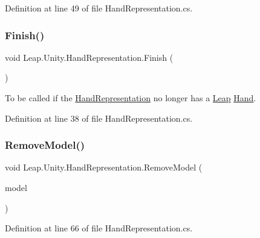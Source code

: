 Definition at line 49 of file Hand\+Representation.\+cs.

\mbox{\label{class_leap_1_1_unity_1_1_hand_representation_a0f6b705675cb8f356b48330637483e78}} 
\subsubsection{\texorpdfstring{Finish()}{Finish()}}
{\footnotesize\ttfamily void Leap.\+Unity.\+Hand\+Representation.\+Finish (\begin{DoxyParamCaption}{ }\end{DoxyParamCaption})}

To be called if the \mbox{\hyperlink{class_leap_1_1_unity_1_1_hand_representation}{Hand\+Representation}} no longer has a \mbox{\hyperlink{namespace_leap_1_1_unity_1_1_leap}{Leap}} \mbox{\hyperlink{class_leap_1_1_hand}{Hand}}. 

Definition at line 38 of file Hand\+Representation.\+cs.

\mbox{\label{class_leap_1_1_unity_1_1_hand_representation_a6fa7f5ae7b4027c0d9b4a3c6b1b0d44f}} 
\subsubsection{\texorpdfstring{RemoveModel()}{RemoveModel()}}
{\footnotesize\ttfamily void Leap.\+Unity.\+Hand\+Representation.\+Remove\+Model (\begin{DoxyParamCaption}\item[{\mbox{\hyperlink{class_leap_1_1_unity_1_1_hand_model_base}{Hand\+Model\+Base}}}]{model }\end{DoxyParamCaption})}



Definition at line 66 of file Hand\+Representation.\+cs.

\mbox{\label{class_leap_1_1_unity_1_1_hand_representation_ae15ad136584177f5394e1a157089ef3d}} 
